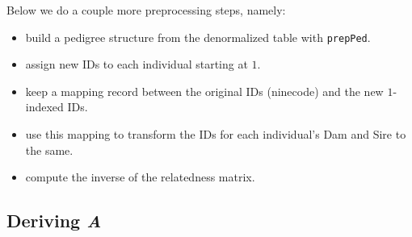 Below we do a couple more preprocessing steps, namely:

\begin{itemize}
\tightlist
\item
  build a pedigree structure from the denormalized table with
  \texttt{prepPed}.
\item
  assign new IDs to each individual starting at \(1\).
\item
  keep a mapping record between the original IDs (ninecode) and the new
  \(1\)-indexed IDs.
\item
  use this mapping to transform the IDs for each individual's Dam and
  Sire to the same.
\item
  compute the inverse of the relatedness matrix.
\end{itemize}

\begin{Shaded}
\begin{Highlighting}[]
\SpecialCharTok{$}\OtherTok{\textless{}{-}} \SpecialCharTok{$}
                                    \NormalTok{)}
\SpecialCharTok{$}\OtherTok{\textless{}{-}} \SpecialCharTok{$}
                                \NormalTok{)}
\SpecialCharTok{$}\OtherTok{\textless{}{-}} \SpecialCharTok{$}
                                        \NormalTok{)}
\SpecialCharTok{$}\OtherTok{\textless{}{-}} \SpecialCharTok{$}
                                        \NormalTok{)}

\SpecialCharTok{$}\OtherTok{\textless{}{-}}\SpecialCharTok{$}\SpecialCharTok{{-}} 
\end{Highlighting}
\end{Shaded}

\hypertarget{deriving-a}{%
\subsection*{\texorpdfstring{Deriving
\emph{A}}{Deriving A}}\label{deriving-a}}


